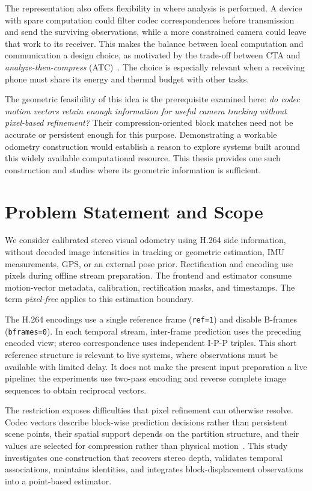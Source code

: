 The representation also offers flexibility in where analysis is performed.
A device with spare computation could filter codec correspondences before
transmission and send the surviving observations, while a more constrained
camera could leave that work to its receiver. This makes the balance between
local computation and communication a design choice, as motivated by the
trade-off between CTA and \emph{analyze-then-compress}
(ATC)~\cite{redondi2016cta}. The choice is especially relevant when
a receiving phone must share its energy and thermal budget with other tasks.

The geometric feasibility of this idea is the prerequisite examined here:
\emph{do codec motion vectors retain enough information for useful camera
tracking without pixel-based refinement?} Their compression-oriented block
matches need not be accurate or persistent enough for this purpose. Demonstrating
a workable odometry construction would establish a reason to explore systems
built around this widely available computational resource. This thesis provides
one such construction and studies where its geometric information is sufficient.

\section{Problem Statement and Scope}

We consider calibrated stereo visual odometry using H.264 side information,
without decoded image intensities in tracking or geometric estimation, IMU
measurements, GPS, or an external pose prior. Rectification and encoding use
pixels during offline stream preparation. The frontend and estimator consume
motion-vector metadata, calibration, rectification masks, and timestamps. The
term \emph{pixel-free} applies to this estimation boundary.

The H.264 encodings use a single reference frame (\texttt{ref=1}) and disable
B-frames (\texttt{bframes=0}). In each temporal stream, inter-frame prediction
uses the preceding encoded view; stereo correspondence uses independent
I-P-P triples. This short reference structure is relevant to live systems,
where observations must be available with limited delay. It does not make
the present input preparation a live pipeline: the experiments use two-pass
encoding and reverse complete image sequences to obtain reciprocal vectors.

The restriction exposes difficulties that pixel refinement can otherwise
resolve. Codec vectors describe block-wise prediction decisions rather than
persistent scene points, their spatial support depends on the partition
structure, and their values are selected for compression rather than physical
motion~\cite{young2020fast,hilscher2026voca}. This study investigates one
construction that recovers stereo depth, validates temporal associations,
maintains identities, and integrates block-displacement observations into a
point-based estimator.

